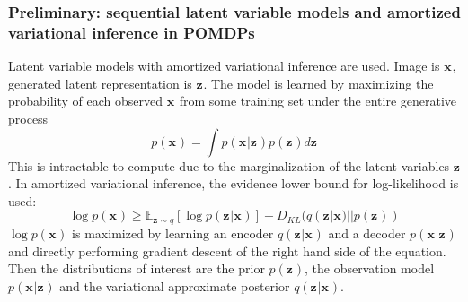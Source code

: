 \documentclass{article}
\begin{document}
\subsubsection{Preliminary: sequential latent variable models and
amortized variational inference in POMDPs}
Latent variable models with
amortized variational inference are used.
Image is $ \bm{x}_{}  $, generated latent representation is $ \bm{z}_{}  $.
The model is learned by maximizing the probability of each observed $ \bm{x}_{}  $
from some training set under the entire generative process
\begin{equation}
		p (\bm{x}_{}) = \int
		p (\bm{x}_{}|\bm{z}_{}) p (\bm{z}_{}) d \bm{z}_{}
\end{equation}
This is intractable to compute due to the marginalization of the latent variables $ \bm{z}_{}  $.
In amortized variational inference, the evidence lower bound for log-likelihood is used:
\begin{equation}
		\log p (\bm{x}_{}) \geq
		\mathbb{E}_{ \bm{z}_{} \sim q }
		\left[ 
\log p (\bm{z}_{}| \bm{x}_{})
		\right] 
		- D_{ KL } (q (\bm{z}_{}| \bm{x}_{}) || p (\bm{z}_{}))
\end{equation}
$ \log p (\bm{x}_{})  $ is maximized by learning an encoder $ q (\bm{z}_{}| \bm{x}_{})  $
and a decoder $ p (\bm{x}_{}| \bm{z}_{})  $ and directly performing
gradient descent of the right hand side of the equation.
Then the distributions of interest are the prior $ p (\bm{z}_{})  $,
the observation model $ p (\bm{x}_{} | \bm{z}_{})  $ and the variational 
approximate posterior $ q (\bm{z}_{}| \bm{x}_{})  $.
\end{document}

